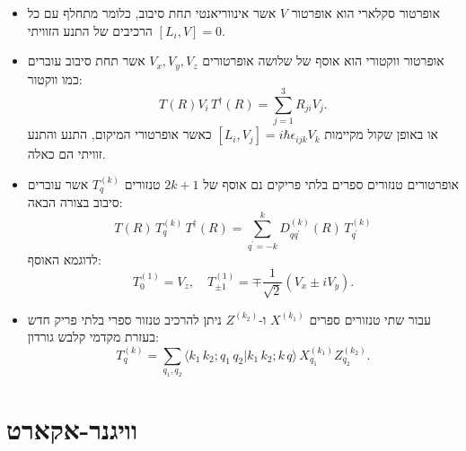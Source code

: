 \documentclass{tstextbook}
\begin{document}
\begin{summary}
  \begin{itemize}
    \item אופרטור סקלארי הוא אופרטור \(V\) אשר אינווריאנטי תחת סיבוב, כלומר מתחלף עם כל הרכיבים של התנע הזוויתי \([L_{i},V]=0\).
    \item אופרטור ווקטורי הוא אוסף של שלושה אופרטורים \(V_{x},V_{y},V_{z}\) אשר תחת סיבוב עוברים כמו ווקטור:
$$T(R)V_{i}\,T^{\dagger}(R)=\sum_{j=1}^{3}R_{j i}V_{j}.$$
או באופן שקול מקיימות \([L_{i},V_{j}]=i\hbar\epsilon_{ijk}V_{k}\) כאשר אופרטורי המיקום, התנע והתנע זוויתי הם כאלה.
    \item אופרטורים טנזורים ספרים בלתי פריקים נם אוסף של \(2k+1\) טנזורים \(T^{(k)}_{q}\) אשר עוברים סיבוב בצורה הבאה:
$$T(R)\,T_{q}^{(k)}\,T^{\dagger}(R)=\sum_{q^{\prime}=-k}^{k}D_{q q^{\prime}}^{(k)}(R)\,T_{q^{\prime}}^{(k)}$$
לדוגמא האוסף:
$$T_{0}^{(1)}=V_{z},\quad T_{\pm1}^{(1)}=\mp\frac{1}{\sqrt{2}}(V_{x}\pm i V_{y}).$$
    \item עבור שתי טנזורים ספרים \(X^{(k_{1})}\) ו-\(Z^{(k_{2})}\) ניתן להרכיב טנזור ספרי בלתי פריק חדש בעזרת מקדמי קלבש גורדון:
$$T_{q}^{(k)}=\sum_{q_{1},q_{2}}\langle k_{1}\,k_{2};q_{1}\,q_{2}|k_{1}\,k_{2};k\,q\rangle\,X_{q_{1}}^{(k_{1})}Z_{q_{2}}^{(k_{2})}.$$
  \end{itemize}
\end{summary}
\section{וויגנר-אקארט}
\end{document}
